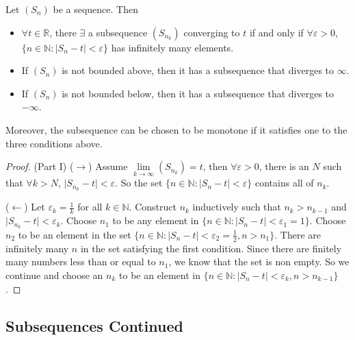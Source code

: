 \documentclass{report}
\begin{document}
\begin{theorem}{11.2}
    Let $(S_{n})$ be a sequence. Then
        \begin{itemize}
            \item $\forall t \in \mathbb{R}$, there $\exists $ a subsequence $(S_{n_{k}})$ converging to $t$ if and only if $\forall \varepsilon > 0$, $\{n \in \mathbb{N} : \lvert S_{n} - t \rvert < \varepsilon\}$ has infinitely many elements.

            \item If $(S_{n})$ is not bounded above, then it has a subsequence that diverges to $\infty$.

            \item If $(S_{n})$ is not bounded below, then it has a subsequence that diverges to $-\infty$. 
        \end{itemize}
    Moreover, the subsequence can be chosen to be monotone if it satisfies one to the three conditions above.
\end{theorem}
    \begin{proof}
        (Part I) ($\rightarrow $) Assume $\lim\limits_{k \to \infty}(S_{n_{k}}) = t$, then $\forall \varepsilon > 0$, there is an $N$ such that $\forall k > N$, $\lvert S_{n_{k}} - t \rvert < \varepsilon$. So the set $\{n \in \mathbb{N} : \lvert S_{n} - t \rvert < \varepsilon\}$ contains all of $n_{k}$.

        ($\leftarrow $) Let $\varepsilon_{k} = \frac{1}{k}$ for all $k \in \mathbb{N}$. Construct $n_{k}$ inductively such that $n_{k} > n_{k - 1}$ and $\lvert S_{n_{k}} - t \rvert <  \varepsilon_{k}$. Choose $n_{1}$ to be any element in $\{n \in \mathbb{N} : \lvert S_{n} - t \rvert < \varepsilon_{1} = 1\}$. Choose $n_{2}$ to be an element in the set $\{n \in \mathbb{N} : \lvert S_{n} - t \rvert <  \varepsilon_{2} = \frac{1}{2}, n > n_{1}\}$. There are infinitely many $n$ in the set satisfying the first condition. Since there are finitely many numbers less than or equal to $n_{1}$, we know that the set is non empty. So we continue and choose an $n_{k}$ to be an element in $\{n \in \mathbb{N} : \lvert S_{n} - t \rvert < \varepsilon_{k}, n > n_{k - 1}\}$.
    \end{proof}

\begin{topic}
    \section{Subsequences Continued}
\end{topic}
\end{document}
